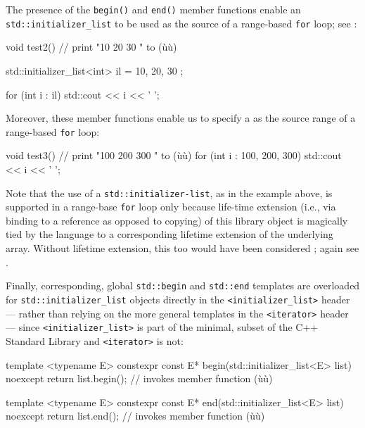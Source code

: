 The presence of the \lstinline!begin()! and \lstinline!end()! member functions
enable an \lstinline!std::initializer_list! to be used as the source of a
range-based \lstinline!for! loop; see :

\begin{emcppslisting}[emcppsbatch=e3]
void test2()  // print "10 20 30 " to (ù{}ù)
{
    std::initializer_list<int> il = { 10, 20, 30 };

    for (int i : il)
    {
        std::cout << i << ' ';
    }
}
\end{emcppslisting}
    

\noindent Moreover, these member functions enable us to specify a
 as the source range of a range-based
\lstinline!for! loop:

\begin{emcppslisting}[emcppsbatch=e3]
void test3()  // print "100 200 300 " to (ù{}ù)
{
    for (int i : {100, 200, 300})
    {
        std::cout << i << ' ';
    }
}
\end{emcppslisting}
    

\noindent Note that the use of a 
\lstinline!std::initializer-list!, as in the example above, is supported in
a range-base \lstinline!for! loop only because life-time extension (i.e.,
via binding to a reference as opposed to copying) of this library object
is magically tied by the language to a corresponding lifetime extension
of the underlying array. Without lifetime extension, this too would have
been considered ; again see .

Finally, corresponding, global \lstinline!std::begin! and \lstinline!std::end!
 templates are overloaded for
\lstinline!std::initializer_list! objects directly in the
\lstinline!<initializer_list>! header --- rather than relying on the more
general templates in the \lstinline!<iterator>! header --- since
\lstinline!<initializer_list>! is part of the minimal,
 subset of the C++ Standard Library and
\lstinline!<iterator>! is not:

\begin{emcppslisting}[emcppsbatch=e3]
template <typename E>
constexpr const E* begin(std::initializer_list<E> list) noexcept
{
    return list.begin();  // invokes member function (ù{}ù)
}

template <typename E>
constexpr const E* end(std::initializer_list<E> list) noexcept
{
    return list.end();  // invokes member function (ù{}ù)
}
\end{emcppslisting}
    

